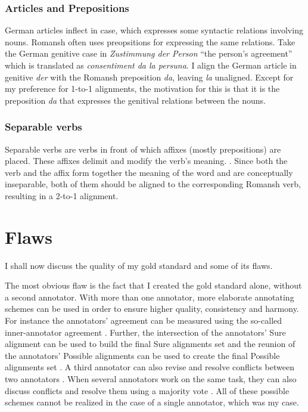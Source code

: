 \subsubsection{Articles and Prepositions}
German articles inflect in case, which expresses some syntactic relations involving nouns. 
Romansh often uses preopsitions for expressing the same relations. 
Take the German genitive case in \emph{Zustimmung der Person} \enquote{the person's agreement} which is translated as \emph{consentiment da la persuna}. 
I align the German article in genitive  \emph{der} with the Romansh preposition \emph{da}, leaving \emph{la} unaligned. 
Except for my preference for 1-to-1 alignments, the motivation for this is that it is the preposition \emph{da} that expresses the genitival relations between the nouns.

\subsubsection{Separable verbs}
Separable verbs are verbs in front of which affixes (mostly prepositions) are placed. 
These affixes delimit and modify the verb's meaning. \autocite[47]{dryer-2009}. 
Since both the verb and the affix form together the meaning of the word and are conceptually inseparable, both of them should be aligned to the corresponding Romansh verb, resulting in a 2-to-1 alignment.

\section{Flaws}
\label{sec:gold-flaws}
I shall now discuss the quality of my gold standard and some of its flaws.

The most obvious flaw is the fact that I created the gold standard alone, without a second annotator. 
With more than one annotator, more elaborate annotating schemes can be used in order to ensure higher quality, consistency and harmony. 
For instance the annotators' agreement can be measured using the so-called inner-annotator agreement \autocite{holmqvist-ahrenberg-2011-gold}. 
Further, the intersection of the annotators' Sure alignment can be used to build the final Sure alignments set and the reunion of the annotators' Possible alignments can be used to create the final Possible alignments set \autocite{mihalcea-pedersen-2003-evaluation}.
A third annotator can also revise and resolve conflicts between two annotators \autocite{mihalcea-pedersen-2003-evaluation}.
When several annotators work on the same task, they can also discuss conflicts and resolve them using a majority vote \autocite{DBLP:journals/corr/cmp-lg-9805004}.
All of these possible schemes cannot be realized in the case of a single annotator, which was my case.

